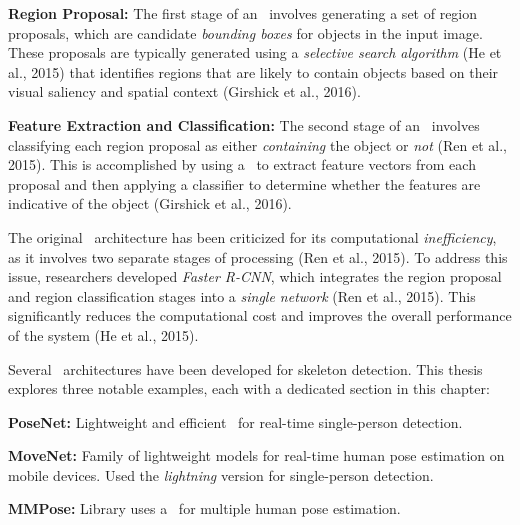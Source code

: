 \startitemize[1]
    \item {\bf Region Proposal:} The first stage of an \RCNN\ involves generating a set of region proposals, which are candidate {\em bounding boxes} for objects in the input image. These proposals are typically generated using a {\em selective search algorithm} (\scc He et al., 2015) that identifies regions that are likely to contain objects based on their visual saliency and spatial context (\scc Girshick et al., 2016).
    \item {\bf Feature Extraction and Classification:} The second stage of an \RCNN\ involves classifying each region proposal as either {\em containing} the object or {\em not} (\scc Ren et al., 2015). This is accomplished by using a \CNN\ to extract feature vectors from each proposal and then applying a classifier to determine whether the features are indicative of the object (\scc Girshick et al., 2016).
\stopitemize

The original \RCNN\ architecture has been criticized for its computational {\em inefficiency}, as it involves two separate stages of processing (\scc Ren et al., 2015). To address this issue, researchers developed {\em Faster R-CNN}, which integrates the region proposal and region classification stages into a {\em single network} (\scc Ren et al., 2015). This significantly reduces the computational cost and improves the overall performance of the system (\scc He et al., 2015).

Several \NN\ architectures have been developed for skeleton detection. This thesis explores three notable examples, each with a dedicated section in this chapter:

\startitemize[n]
    \item {\bf PoseNet:} Lightweight and efficient \CNN\ for real-time single-person detection.
    \item {\bf MoveNet:} Family of lightweight models for real-time human pose estimation on mobile devices. Used the {\em lightning} version for single-person detection.
    \item {\bf MMPose:} Library uses a \CNN\ for multiple human pose estimation.
\stopitemize


